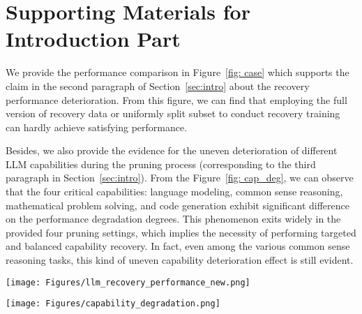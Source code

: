 \section{Supporting Materials for Introduction Part}
\label{appendix:intro suppport}
We provide the performance comparison in Figure~\ref{fig: case} which supports the claim in the second paragraph of Section~\ref{sec:intro} about the recovery performance deterioration. From this figure, we can find that employing the full version of recovery data or uniformly split subset to conduct recovery training can hardly achieve satisfying performance.

Besides, we also provide the evidence for the uneven deterioration of different LLM capabilities during the pruning process (corresponding to the third paragraph in Section~\ref{sec:intro}). From the Figure~\ref{fig: cap_deg}, we can observe that the four critical capabilities: language modeling, common sense reasoning, mathematical problem solving, and code generation exhibit significant difference on the performance degradation degrees. This phenomenon exits widely in the provided four pruning settings, which implies the necessity of performing targeted and balanced capability recovery. In fact, even among the various common sense reasoning tasks, this kind of uneven capability deterioration effect is still evident.
\begin{figure*}[]
    \centering
    \texttt{[image: Figures/llm\_recovery\_performance\_new.png]}
    \caption{Average performance on seven common LLM reasoning evaluation tasks after recovery post-training with different data. The numbers in brackets represent the group index of the data subset in the full dataset. \textit{Unpruned} indicates the original model and \textit{w/o Training} indicates the pruned model (using LLM-Pruner~\citep{ma2023llm}) without the recovery post-training.}
   \label{fig: case}
    \vspace{-0.3cm}
\end{figure*}

\begin{figure*}[]
    \centering
    \texttt{[image: Figures/capability\_degradation.png]}
    \caption{Normalized Performance Degradation ($\%$) on four various capabilities under four LLM pruning settings.}
   \label{fig: cap_deg}
    \vspace{-0.3cm}
\end{figure*}

